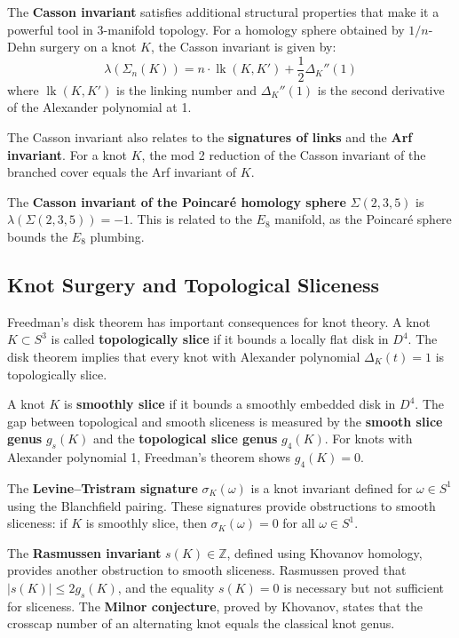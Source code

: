 The \textbf{Casson invariant} satisfies additional structural properties that make it a powerful tool in 3-manifold topology. For a homology sphere obtained by $1/n$-Dehn surgery on a knot $K$, the Casson invariant is given by:
\[
\lambda(\Sigma_n(K)) = n \cdot \operatorname{lk}(K, K') + \frac{1}{2} \Delta_K''(1)
\]
where $\operatorname{lk}(K, K')$ is the linking number and $\Delta_K''(1)$ is the second derivative of the Alexander polynomial at 1.

The Casson invariant also relates to the \textbf{signatures of links} and the \textbf{Arf invariant}. For a knot $K$, the mod 2 reduction of the Casson invariant of the branched cover equals the Arf invariant of $K$.

The \textbf{Casson invariant of the Poincaré homology sphere} $\Sigma(2,3,5)$ is $\lambda(\Sigma(2,3,5)) = -1$. This is related to the $E_8$ manifold, as the Poincaré sphere bounds the $E_8$ plumbing.

\subsection*{Knot Surgery and Topological Sliceness}

Freedman's disk theorem has important consequences for knot theory. A knot $K \subset S^3$ is called \textbf{topologically slice} if it bounds a locally flat disk in $D^4$. The disk theorem implies that every knot with Alexander polynomial $\Delta_K(t) = 1$ is topologically slice.

A knot $K$ is \textbf{smoothly slice} if it bounds a smoothly embedded disk in $D^4$. The gap between topological and smooth sliceness is measured by the \textbf{smooth slice genus} $g_s(K)$ and the \textbf{topological slice genus} $g_4(K)$. For knots with Alexander polynomial 1, Freedman's theorem shows $g_4(K) = 0$.

The \textbf{Levine--Tristram signature} $\sigma_K(\omega)$ is a knot invariant defined for $\omega \in S^1$ using the Blanchfield pairing. These signatures provide obstructions to smooth sliceness: if $K$ is smoothly slice, then $\sigma_K(\omega) = 0$ for all $\omega \in S^1$.

The \textbf{Rasmussen invariant} $s(K) \in \mathbb{Z}$, defined using Khovanov homology, provides another obstruction to smooth sliceness. Rasmussen proved that $|s(K)| \leq 2g_s(K)$, and the equality $s(K) = 0$ is necessary but not sufficient for sliceness. The \textbf{Milnor conjecture}, proved by Khovanov, states that the crosscap number of an alternating knot equals the classical knot genus.

